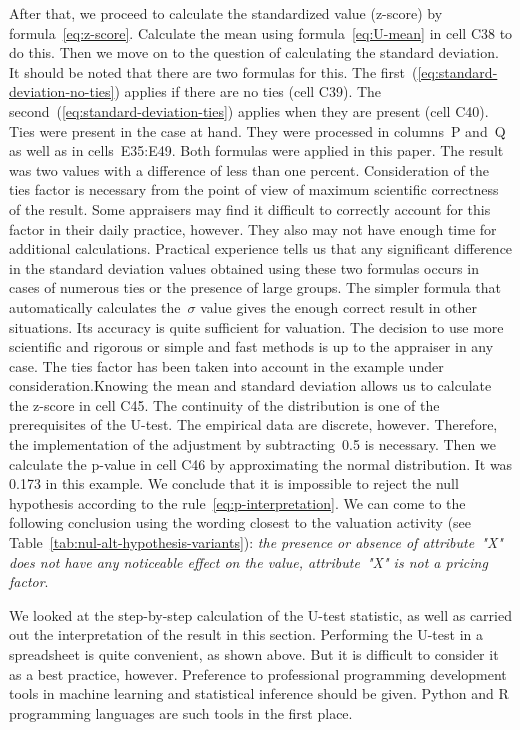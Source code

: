 \documentclass[]{scrreprt}
\begin{document}
After that, we proceed to calculate the standardized value (z-score) by formula~\ref{eq:z-score}. Calculate the mean using formula~\ref{eq:U-mean} in cell C38 to do this. Then we move on to the question of calculating the standard deviation. It should be noted that there are two formulas for this. The first~(\ref{eq:standard-deviation-no-ties}) applies if there are no ties (cell C39). The second~(\ref{eq:standard-deviation-ties}) applies when they are present (cell C40). Ties were present in the case at hand. They were processed in columns~P and~Q as well as in cells~E35:E49. Both formulas were applied in this paper. The result was two values with a difference of less than one percent. Consideration of the ties factor is necessary from the point of view of maximum scientific correctness of the result. Some appraisers may find it difficult to correctly account for this factor in their daily practice, however. They also may not have enough time for additional calculations. Practical experience tells us that any significant difference in the standard deviation values obtained using these two formulas occurs in cases of numerous ties or the presence of large groups. The simpler formula that automatically calculates the~${\sigma}$ value gives the enough correct result in other situations. Its accuracy is quite sufficient for valuation. The decision to use more scientific and rigorous or simple and fast methods is up to the appraiser in any case. The ties factor has been taken into account in the example under consideration.Knowing the mean and standard deviation allows us to calculate the z-score in cell C45. The continuity of the distribution is one of the prerequisites of the U-test. The empirical data are discrete, however. Therefore, the implementation of the adjustment by subtracting~0.5 is necessary. Then we calculate the p-value in cell C46 by approximating the normal distribution. It was 0.173 in this example. We conclude that it is impossible to reject the null hypothesis according to the rule~\ref{eq:p-interpretation}. We can come to the following conclusion using the wording closest to the valuation activity (see Table~\ref{tab:nul-alt-hypothesis-variants}): \emph{the presence or absence of attribute~"X" does not have any noticeable effect on the value, attribute~"X" is not a pricing factor}.

We looked at the step-by-step calculation of the U-test statistic, as well as carried out the interpretation of the result in this section. Performing the U-test in a spreadsheet is quite convenient, as shown above. But it is difficult to consider it as a best practice, however. Preference to professional programming development tools in machine learning and statistical inference should be given. Python and R programming languages are such tools in the first place.
%
\clearpage
%
\end{document}
